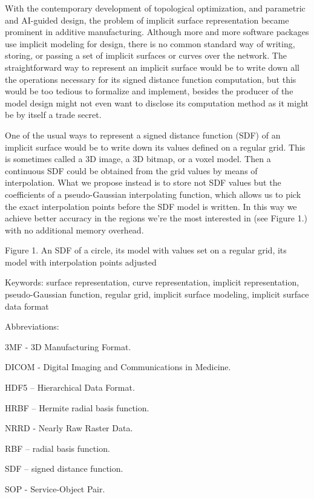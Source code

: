 \documentclass[12pt,a4paper]{article}
\begin{document}
\par
With the contemporary development of topological optimization, and parametric and AI-guided design, the problem of implicit surface representation became prominent in additive manufacturing. Although more and more software packages use implicit modeling for design, there is no common standard way of writing, storing, or passing a set of implicit surfaces or curves over the network. The straightforward way to represent an implicit surface would be to write down all the operations necessary for its signed distance function computation, but this would be too tedious to formalize and implement, besides the producer of the model design might not even want to disclose its computation method as it might be by itself a trade secret.
\par
One of the usual ways to represent a signed distance function (SDF) of an implicit surface would be to write down its values defined on a regular grid. This is sometimes called a 3D image, a 3D bitmap, or a voxel model. Then a continuous SDF could be obtained from the grid values by means of interpolation. What we propose instead is to store not SDF values but the coefficients of a pseudo-Gaussian interpolating function, which allows us to pick the exact interpolation points before the SDF model is written. In this way we achieve better accuracy in the regions we’re the most interested in (see Figure 1.) with no additional memory overhead.
\par
Figure 1. An SDF of a circle, its model with values set on a regular grid, its model with interpolation points adjusted
\par
Keywords: surface representation, curve representation, implicit representation, pseudo-Gaussian function, regular grid, implicit surface modeling, implicit surface data format
\par
Abbreviations:
\par
3MF - 3D Manufacturing Format.
\par
DICOM - Digital Imaging and Communications in Medicine.
\par
HDF5 – Hierarchical Data Format.
\par
HRBF – Hermite radial basis function.
\par
NRRD - Nearly Raw Raster Data.
\par
RBF – radial basis function.
\par
SDF – signed distance function.
\par
SOP - Service-Object Pair.
\par
\end{document}
